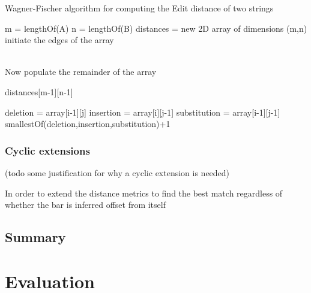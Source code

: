 \documentclass[12pt,twoside,notitlepage]{report}
\begin{document}
		\begin{algorithm}
				\caption{Wagner-Fischer algorithm for computing the Edit distance of two strings}
				\label{algo:WagnerFischer}
				\begin{algorithmic}[1]
						\State m = lengthOf(A)
						\State n = lengthOf(B)
						\State distances = new 2D array of dimensions (m,n)		
						\State \\initiate the edges of the array
							
						\EndFor
						\EndFor
						
						\State \\Now populate the remainder of the array
								\Else
									
								\EndIf
							\EndFor
						\EndFor
						
						\State \Return distances[m-1][n-1]


					\EndProcedure
						\State deletion = array[i-1][j]
						\State insertion = array[i][j-1]
						\State substitution = array[i-1][j-1]
						\State \Return smallestOf(deletion,insertion,substitution)+1
					\EndProcedure
				\end{algorithmic}
				\end{algorithm}
		
		
		\subsection{Cyclic extensions}
		(todo some justification for why a cyclic extension is needed)
		
		In order to extend the distance metrics to find the best match regardless of whether the bar is inferred offset from itself
	\section{Summary}
	

\cleardoublepage
\chapter{Evaluation}
\end{document}
